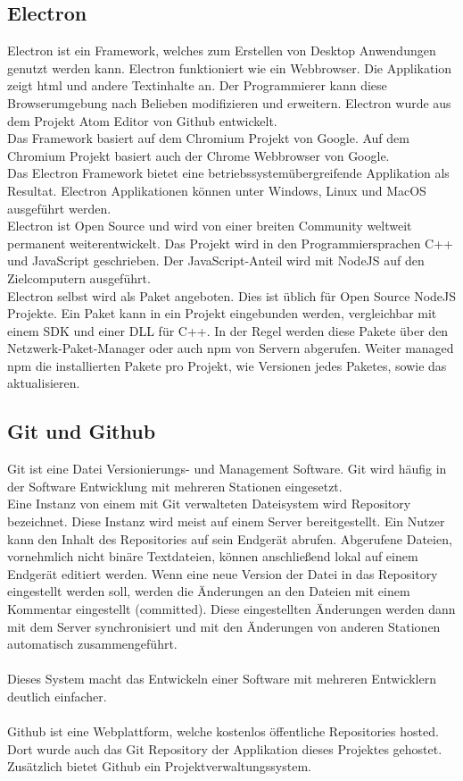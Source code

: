 \documentclass[11pt]{scrartcl}
\begin{document}
\subsection{Electron}
Electron ist ein Framework, welches zum Erstellen von Desktop Anwendungen genutzt werden kann. Electron funktioniert
wie ein Webbrowser. Die Applikation zeigt \ac{html} und andere Textinhalte an.\cite{electron} Der Programmierer kann diese
Browserumgebung nach Belieben modifizieren und erweitern. Electron wurde aus dem Projekt Atom Editor von Github entwickelt.\\
Das Framework basiert auf dem Chromium Projekt von Google. Auf dem Chromium Projekt basiert auch der Chrome Webbrowser von
Google.\\
Das Electron Framework bietet eine betriebssystemübergreifende Applikation als Resultat. Electron Applikationen können unter
Windows, Linux und MacOS ausgeführt werden.\\
Electron ist Open Source und wird von einer breiten Community weltweit permanent weiterentwickelt.\cite{electron} Das Projekt wird
in den Programmiersprachen C++ und JavaScript geschrieben. Der JavaScript-Anteil wird mit NodeJS auf den Zielcomputern ausgeführt.\\
Electron selbst wird als Paket angeboten. Dies ist üblich für Open Source NodeJS Projekte. Ein Paket kann in ein Projekt eingebunden werden,
vergleichbar mit einem SDK und einer DLL für C++. In der Regel werden diese Pakete über den Netzwerk-Paket-Manager oder auch \ac{npm} von
Servern abgerufen. Weiter managed \ac{npm} die installierten Pakete pro Projekt, wie Versionen jedes Paketes, sowie das aktualisieren.

\subsection{Git und Github}
Git ist eine Datei Versionierungs- und Management Software. Git wird häufig in der Software Entwicklung mit mehreren Stationen eingesetzt.\\
Eine Instanz von einem mit Git verwalteten Dateisystem wird Repository bezeichnet. Diese Instanz wird meist auf einem Server bereitgestellt.
Ein Nutzer kann den Inhalt des Repositories auf sein Endgerät abrufen.
Abgerufene Dateien, vornehmlich nicht binäre Textdateien, können anschließend lokal auf einem Endgerät editiert werden. Wenn eine neue Version
der Datei in das Repository eingestellt werden soll, werden die Änderungen an den Dateien mit einem Kommentar eingestellt (committed).
Diese eingestellten Änderungen werden dann mit dem Server synchronisiert und mit den Änderungen von anderen Stationen automatisch zusammengeführt.\\
\\
Dieses System macht das Entwickeln einer Software mit mehreren Entwicklern deutlich einfacher.\\
\\
Github ist eine Webplattform, welche kostenlos öffentliche Repositories hosted. Dort wurde auch das Git Repository der Applikation
dieses Projektes gehostet.\\
Zusätzlich bietet Github ein Projektverwaltungssystem.
\clearpage
\end{document}
